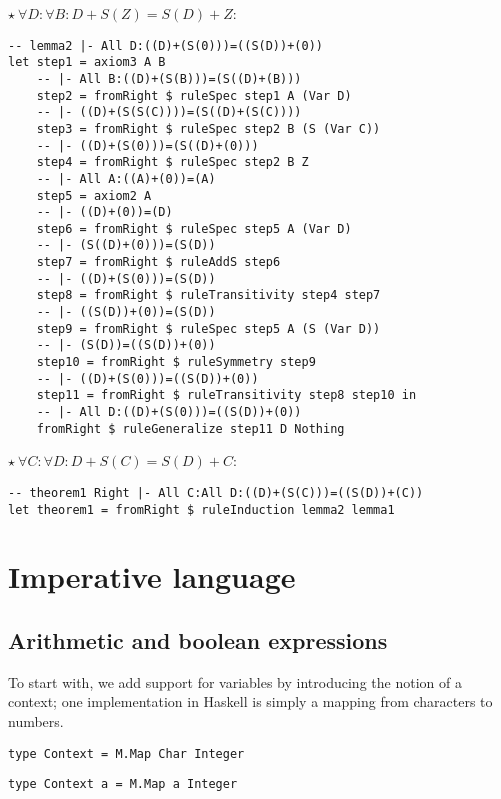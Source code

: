 \documentclass{article}
\begin{document}
\begin{minipage}[t]{0.45\textwidth}
$\star \ \forall D: \forall B: D + S(Z) = S(D) + Z$:

\begin{lstlisting}
-- lemma2 |- All D:((D)+(S(0)))=((S(D))+(0))
let step1 = axiom3 A B
    -- |- All B:((D)+(S(B)))=(S((D)+(B)))
    step2 = fromRight $ ruleSpec step1 A (Var D)
    -- |- ((D)+(S(S(C))))=(S((D)+(S(C))))
    step3 = fromRight $ ruleSpec step2 B (S (Var C))
    -- |- ((D)+(S(0)))=(S((D)+(0)))
    step4 = fromRight $ ruleSpec step2 B Z
    -- |- All A:((A)+(0))=(A)
    step5 = axiom2 A
    -- |- ((D)+(0))=(D)
    step6 = fromRight $ ruleSpec step5 A (Var D)
    -- |- (S((D)+(0)))=(S(D))
    step7 = fromRight $ ruleAddS step6
    -- |- ((D)+(S(0)))=(S(D))
    step8 = fromRight $ ruleTransitivity step4 step7
    -- |- ((S(D))+(0))=(S(D))
    step9 = fromRight $ ruleSpec step5 A (S (Var D))
    -- |- (S(D))=((S(D))+(0))
    step10 = fromRight $ ruleSymmetry step9
    -- |- ((D)+(S(0)))=((S(D))+(0))
    step11 = fromRight $ ruleTransitivity step8 step10 in
    -- |- All D:((D)+(S(0)))=((S(D))+(0))
    fromRight $ ruleGeneralize step11 D Nothing
\end{lstlisting}

$\star \ \forall C: \forall D: D + S(C) = S(D) + C$:

\begin{lstlisting}
-- theorem1 Right |- All C:All D:((D)+(S(C)))=((S(D))+(C))
let theorem1 = fromRight $ ruleInduction lemma2 lemma1
\end{lstlisting}
\end{minipage}

\section{Imperative language}

\subsection{Arithmetic and boolean expressions}

To start with, we add support for variables by introducing the notion of a context; one implementation in Haskell is simply a mapping from characters to numbers.

\begin{minipage}{0.49\textwidth}
\begin{lstlisting}
type Context = M.Map Char Integer
\end{lstlisting}
\end{minipage}
\begin{minipage}{0.49\textwidth}
\begin{lstlisting}
type Context a = M.Map a Integer
\end{lstlisting}
\end{minipage}
\end{document}

